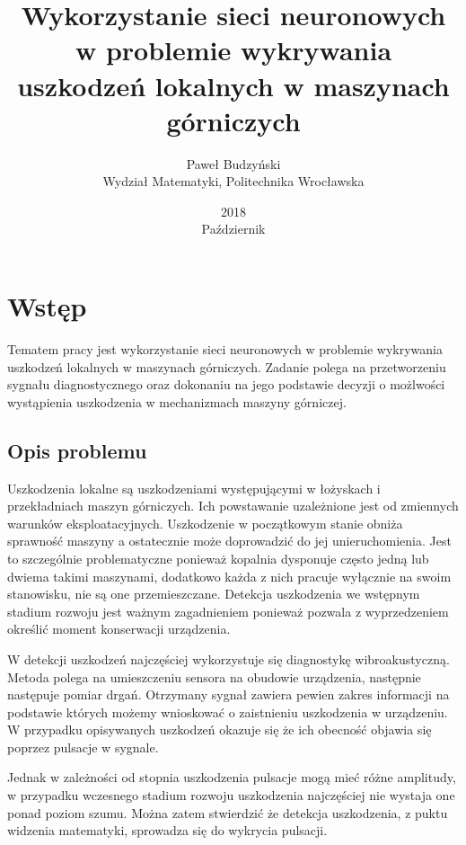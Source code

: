 \documentclass[12pt, a4paper, oneside]{article}
\author{Paweł Budzyński \\ Wydział Matematyki, Politechnika Wrocławska}
\title{\textbf{Wykorzystanie sieci neuronowych w problemie wykrywania uszkodzeń lokalnych w maszynach górniczych}}
\date{2018 \\ Październik}
\newcommand{\mychapter}[2]{
	\setcounter{chapter}{#1}
	\setcounter{section}{0}
	\chapter*{#2}
	\addcontentsline{toc}{chapter}{#2}
}
\begin{document}
	\maketitle
	\section{Wstęp}
	Tematem pracy jest wykorzystanie sieci neuronowych w problemie wykrywania uszkodzeń lokalnych w maszynach górniczych. Zadanie polega na przetworzeniu sygnału diagnostycznego oraz dokonaniu na jego podstawie decyzji o możlwości wystąpienia uszkodzenia w mechanizmach maszyny górniczej.
	
	\subsection{Opis problemu}
	
	Uszkodzenia lokalne są uszkodzeniami występującymi w łożyskach i przekładniach maszyn górniczych. Ich powstawanie uzależnione jest od zmiennych warunków eksploatacyjnych. Uszkodzenie w początkowym stanie obniża sprawność maszyny a ostatecznie może doprowadzić do jej unieruchomienia. Jest to szczególnie problematyczne ponieważ kopalnia dysponuje często jedną lub dwiema takimi maszynami, dodatkowo każda z nich pracuje wyłącznie na swoim stanowisku, nie są one przemieszczane. Detekcja uszkodzenia we wstępnym stadium rozwoju jest ważnym zagadnieniem ponieważ pozwala z wyprzedzeniem określić moment konserwacji urządzenia. 
	
		W detekcji uszkodzeń najczęściej wykorzystuje się diagnostykę wibroakustyczną. Metoda polega na umieszczeniu sensora na obudowie urządzenia, następnie następuje pomiar drgań. Otrzymany sygnał zawiera pewien zakres informacji na podstawie których możemy wnioskować o zaistnieniu uszkodzenia w urządzeniu. W przypadku opisywanych uszkodzeń okazuje się że ich obecność objawia się poprzez pulsacje w sygnale.
	
	Jednak w zależności od stopnia uszkodzenia pulsacje mogą mieć różne amplitudy, w przypadku wczesnego stadium rozwoju uszkodzenia najczęściej nie wystaja one ponad poziom szumu.
	Można zatem stwierdzić że detekcja uszkodzenia, z puktu widzenia matematyki, sprowadza się do wykrycia pulsacji. 
	
	
\end{document}
